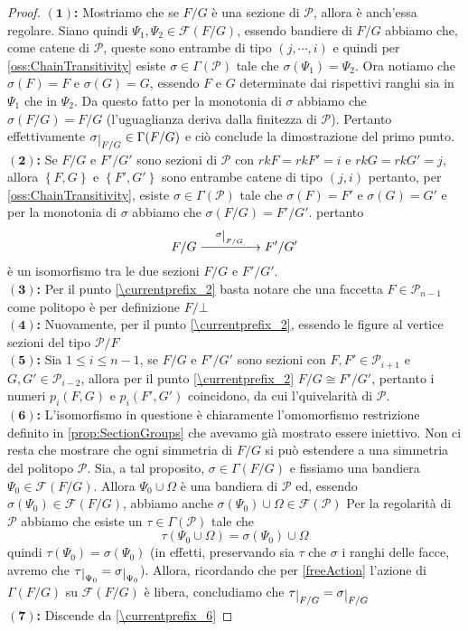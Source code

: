 \documentclass[a4paper,12pt]{report}
\newcommand{\p}{\mathcal{P}}
\theoremstyle{plain}
\theoremstyle{definition}
\newcommand\localref[1]{\ref{\currentprefix_#1}}
\newcommand\point[1]{$\bm{(#1)}$\textbf{: }}
\newcommand\flag[1]{\mathcal{F}(#1)}
\def\restrict#1{\raise-.5ex\hbox{\ensuremath|}_{#1}}
\begin{document}
\begin{proof}
\point{1}Mostriamo che se $F/G$ \`e una sezione di $\p$, allora \`e anch'essa regolare. Siano quindi $\Psi_1,\Psi_2\in\mathcal{F}(F/G)$, essendo
bandiere di $F/G$ abbiamo che, come catene di $\p$, queste sono entrambe di tipo $(j,\cdots,i)$ e quindi per \ref{oss:ChainTransitivity} esiste
$\sigma\in\Gamma(\p)$ tale che $\sigma(\Psi_1)=\Psi_2$. Ora notiamo che $\sigma(F)=F$ e $\sigma(G)=G$, essendo $F$ e $G$ determinate
dai rispettivi ranghi sia in $\Psi_1$ che in $\Psi_2$. Da questo fatto per la monotonia di $\sigma$ abbiamo che $\sigma(F/G)=F/G$
(l'uguaglianza deriva dalla finitezza di $\p$). Pertanto effettivamente $\sigma\restrict{F/G}\in\Gamma(F/G)$
e ci\`o conclude la dimostrazione del primo punto.\\
\point{2}Se $F/G$ e $F'/G'$ sono sezioni di $\p$ con $rkF=rkF'=i$ e $rkG=rkG'=j$, allora $\left\{F,G\right\}$ e $\left\{F',G'\right\}$ sono entrambe
catene di tipo $(j,i)$ pertanto, per \ref{oss:ChainTransitivity}, esiste $\sigma\in\Gamma(\p)$ tale che $\sigma(F)=F'$ e 
$\sigma(G)=G'$ e per la monotonia di $\sigma$ abbiamo che $\sigma(F/G)=F'/G'$. pertanto
\begin{equation*}
F/G\xrightarrow{\quad\sigma\restrict{F/G}\quad}F'/G'
\end{equation*}
\`e un isomorfismo tra le due sezioni $F/G$ e $F'/G'$.\\
\point{3}Per il punto \localref{2} basta notare che una faccetta $F\in\p_{n-1}$ come politopo \`e per definizione $F/\bot$\\
\point{4}Nuovamente, per il punto \localref{2}, essendo le figure al vertice sezioni del tipo $\p/F$\\
\point{5}Sia $1\leq i\leq n-1$, se $F/G$ e $F'/G'$ sono sezioni con $F,F'\in\p_{i+1}$ e $G,G'\in\p_{i-2}$, allora
per il punto \localref{2} $F/G\cong F'/G'$, pertanto i numeri $p_i(F,G)$ e $p_i(F',G')$ coincidono, da cui l'quivelarit\`a di $\p$.\\
\point{6}L'isomorfismo in questione \`e chiaramente l'omomorfismo restrizione definito in \ref{prop:SectionGroups} che avevamo gi\`a mostrato
essere iniettivo. Non ci resta che mostrare che ogni simmetria di $F/G$ si pu\`o estendere a una simmetria del politopo $\p$. Sia, a tal proposito,
$\sigma\in\Gamma(F/G)$ e fissiamo una bandiera $\Psi_0\in\mathcal{F}(F/G)$. Allora $\Psi_0\cup\Omega$ \`e una bandiera di $\p$ ed, 
essendo $\sigma(\Psi_0)\in\mathcal{F}(F/G)$, abbiamo anche $\sigma(\Psi_0)\cup\Omega\in\flag{\p}$
Per la regolarit\`a di $\p$ abbiamo che esiste un $\tau\in\Gamma(\p)$ tale che
\begin{equation*}
\tau(\Psi_0\cup\Omega)=\sigma(\Psi_0)\cup\Omega
\end{equation*}
quindi $\tau(\Psi_0)=\sigma(\Psi_0)$ (in effetti, preservando sia $\tau$ che $\sigma$ i ranghi delle facce, avremo che
 $\tau\restrict{\Psi_0}=\sigma\restrict{\Psi_0}$).
Allora, ricordando che per \ref{freeAction} l'azione di $\Gamma(F/G)$ su $\flag{F/G}$ \`e libera, concludiamo che
 $\tau\restrict{F/G}=\sigma\restrict{F/G}$\\
 \point{7}Discende da \localref{6}
\end{proof}
\end{document}
